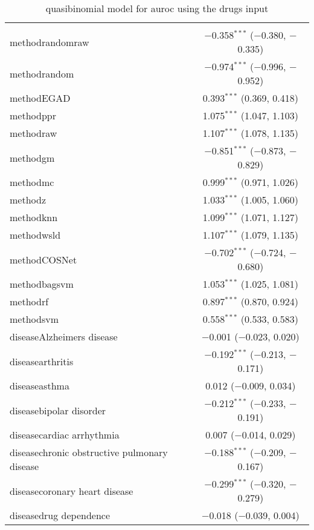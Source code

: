 
\begin{table}[!htbp] \centering 
  \caption{quasibinomial model for auroc using the drugs input} 
  \label{} 
\begin{tabular}{@{\extracolsep{5pt}}lc} 
\\[-1.8ex]\hline 
\hline \\[-1.8ex] 
 methodrandomraw & $-$0.358$^{***}$ ($-$0.380, $-$0.335) \\ 
  methodrandom & $-$0.974$^{***}$ ($-$0.996, $-$0.952) \\ 
  methodEGAD & 0.393$^{***}$ (0.369, 0.418) \\ 
  methodppr & 1.075$^{***}$ (1.047, 1.103) \\ 
  methodraw & 1.107$^{***}$ (1.078, 1.135) \\ 
  methodgm & $-$0.851$^{***}$ ($-$0.873, $-$0.829) \\ 
  methodmc & 0.999$^{***}$ (0.971, 1.026) \\ 
  methodz & 1.033$^{***}$ (1.005, 1.060) \\ 
  methodknn & 1.099$^{***}$ (1.071, 1.127) \\ 
  methodwsld & 1.107$^{***}$ (1.079, 1.135) \\ 
  methodCOSNet & $-$0.702$^{***}$ ($-$0.724, $-$0.680) \\ 
  methodbagsvm & 1.053$^{***}$ (1.025, 1.081) \\ 
  methodrf & 0.897$^{***}$ (0.870, 0.924) \\ 
  methodsvm & 0.558$^{***}$ (0.533, 0.583) \\ 
  diseaseAlzheimers disease & $-$0.001 ($-$0.023, 0.020) \\ 
  diseasearthritis & $-$0.192$^{***}$ ($-$0.213, $-$0.171) \\ 
  diseaseasthma & 0.012 ($-$0.009, 0.034) \\ 
  diseasebipolar disorder & $-$0.212$^{***}$ ($-$0.233, $-$0.191) \\ 
  diseasecardiac arrhythmia & 0.007 ($-$0.014, 0.029) \\ 
  diseasechronic obstructive pulmonary disease & $-$0.188$^{***}$ ($-$0.209, $-$0.167) \\ 
  diseasecoronary heart disease & $-$0.299$^{***}$ ($-$0.320, $-$0.279) \\ 
  diseasedrug dependence & $-$0.018 ($-$0.039, 0.004) \\ 

\end{tabular}
\end{table}
